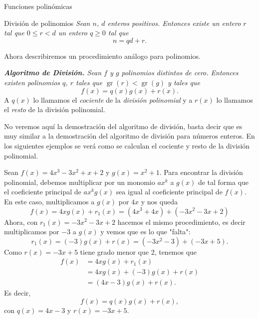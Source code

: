 \begin{chapter}{Funciones polinómicas}
\begin{section}{División de polinomios}
            \textit{Sean $n$, $d$ enteros positivos. Entonces existe un entero $r$ tal que
                $0 \le  r <d$  un entero $q \ge 0$ tal que
                } 
            \begin{equation*}
                n = qd + r.
            \end{equation*}
        
        Ahora describiremos un procedimiento análogo para polinomios.
    
        \textit{\textbf{Algoritmo de División.} Sean $f$ y $g$ polinomios distintos de cero. Entonces existen polinomios $q$, $r$ tales que $\operatorname{gr}(r) < \operatorname{gr}(g)$ y tales que}
        \begin{equation*}
            f (x) = q (x) g (x) + r (x).
        \end{equation*}
        A $q(x)$ lo llamamos el \textit{cociente} de la \textit{división polinomial} y  a $r(x)$ lo llamamos el \textit{resto}  de la división polinomial. 
        
        No veremos aquí la demostración del algoritmo de división, basta decir que es muy similar a  la demostración del algoritmo de división para números enteros. En los siguientes ejemplos se verá como se calculan el cociente y resto de la división polinomial. 
    
        \begin{ejemplo*} Sean $f(x) = 4x^3 - 3x^2 + x + 2$ y $g(x) = x^2 + 1$. Para encontrar la división polinomial, debemos multiplicar por un monomio $ax^k$ a $g(x)$ de tal forma que el coeficiente principal de  $ax^kg(x)$ sea igual al coeficiente principal de $f(x)$. En este caso, multiplicamos a $g(x)$ por $4x$ y nos queda 
        \begin{equation*}
            f(x) = 4xg(x) + r_1(x) = (4x^3 +4x)+(-3x^2-3x +2)
        \end{equation*}
        Ahora,  con $r_1(x)=-3x^2-3x +2$ hacemos el mismo procedimiento,  es decir multiplicamos por $-3$  a $g(x)$ y vemos que es lo que "falta":
        \begin{equation*}
            r_1(x) = (-3)g(x) +r(x) = (-3x^2 -3) + (-3x+5).
        \end{equation*}
        Como $r(x) = -3x+5$ tiene grado menor que 2, tenemos que
        \begin{align*}
        f(x) &= 4xg(x) + r_1(x)\\ &=4xg(x) + (-3)g(x) +r(x)\\& = (4x-3)g(x)+r(x).
        \end{align*}
        Es decir, 
        \begin{equation*}
        f(x) = q(x)g(x)+r(x),
        \end{equation*}
        con $q(x) =4x-3$ y $r(x) = -3x+5$. 
        

\end{ejemplo*}
\end{section}
\end{chapter}
